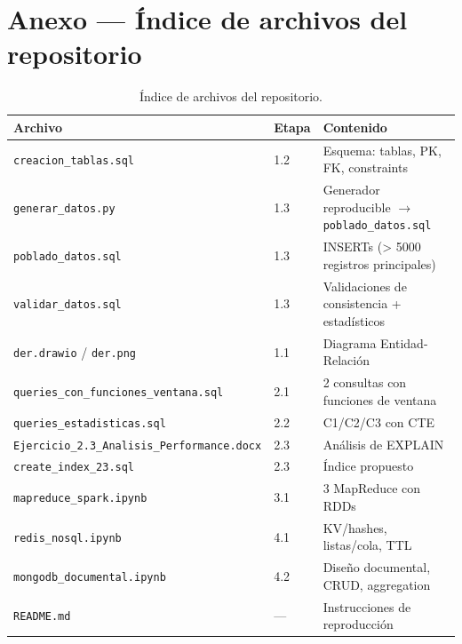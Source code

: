 \documentclass[11pt,a4paper]{article}
\begin{document}
\section*{Anexo — Índice de archivos del repositorio}

\begin{longtable}{@{}p{8cm}p{1.4cm}p{8cm}@{}}
\caption{Índice de archivos del repositorio.}\\
\toprule
\textbf{Archivo} & \textbf{Etapa} & \textbf{Contenido} \\
\midrule
\endhead
\texttt{creacion\_tablas.sql}                    & 1.2 & Esquema: tablas, PK, FK, constraints \\
\texttt{generar\_datos.py}                       & 1.3 & Generador reproducible $\rightarrow$ \texttt{poblado\_datos.sql} \\
\texttt{poblado\_datos.sql}                       & 1.3 & INSERTs (> 5000 registros principales) \\
\texttt{validar\_datos.sql}                       & 1.3 & Validaciones de consistencia + estadísticos \\
\texttt{der.drawio} / \texttt{der.png}            & 1.1 & Diagrama Entidad-Relación \\
\texttt{queries\_con\_funciones\_ventana.sql}     & 2.1 & 2 consultas con funciones de ventana \\
\texttt{queries\_estadisticas.sql}                & 2.2 & C1/C2/C3 con CTE \\
\texttt{Ejercicio\_2.3\_Analisis\_Performance.docx} & 2.3 & Análisis de EXPLAIN \\
\texttt{create\_index\_23.sql}                    & 2.3 & Índice propuesto \\
\texttt{mapreduce\_spark.ipynb}                   & 3.1 & 3 MapReduce con RDDs \\
\texttt{redis\_nosql.ipynb}                       & 4.1 & KV/hashes, listas/cola, TTL \\
\texttt{mongodb\_documental.ipynb}                & 4.2 & Diseño documental, CRUD, aggregation \\
\texttt{README.md}                                & — & Instrucciones de reproducción \\
\bottomrule
\end{longtable}
\end{document}
